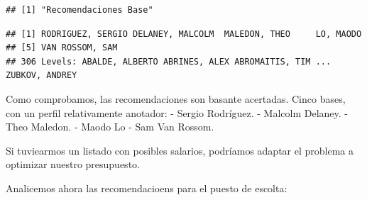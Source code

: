 \documentclass[
]{article}
\newenvironment{Shaded}{\begin{snugshade}}{\end{snugshade}}
\newcommand{\DataTypeTok}[1]{\textcolor[rgb]{0.13,0.29,0.53}{#1}}
\newcommand{\DecValTok}[1]{\textcolor[rgb]{0.00,0.00,0.81}{#1}}
\newcommand{\KeywordTok}[1]{\textcolor[rgb]{0.13,0.29,0.53}{\textbf{#1}}}
\newcommand{\NormalTok}[1]{#1}
\newcommand{\OperatorTok}[1]{\textcolor[rgb]{0.81,0.36,0.00}{\textbf{#1}}}
\newcommand{\OtherTok}[1]{\textcolor[rgb]{0.56,0.35,0.01}{#1}}
\newcommand{\StringTok}[1]{\textcolor[rgb]{0.31,0.60,0.02}{#1}}
\begin{document}
\begin{verbatim}
## [1] "Recomendaciones Base"
\end{verbatim}

\begin{Shaded}
\end{Shaded}

\begin{verbatim}
## [1] RODRIGUEZ, SERGIO DELANEY, MALCOLM  MALEDON, THEO     LO, MAODO        
## [5] VAN ROSSOM, SAM  
## 306 Levels: ABALDE, ALBERTO ABRINES, ALEX ABROMAITIS, TIM ... ZUBKOV, ANDREY
\end{verbatim}

Como comprobamos, las recomendaciones son basante acertadas. Cinco
bases, con un perfil relativamente anotador: - Sergio Rodríguez. -
Malcolm Delaney. - Theo Maledon. - Maodo Lo - Sam Van Rossom.

Si tuviearmos un listado con posibles salarios, podríamos adaptar el
problema a optimizar nuestro presupuesto.

Analicemos ahora las recomendacioens para el puesto de escolta:

\begin{Shaded}
\end{Shaded}
\end{document}
